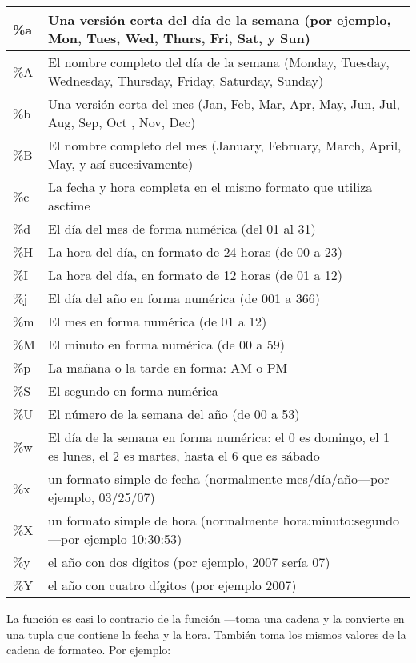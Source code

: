\begin{center}
\begin{tabular}{|l|p{12cm}|}
\hline
\%a & Una versión corta del día de la semana (por ejemplo, Mon, Tues, Wed, Thurs, Fri, Sat, y Sun) \\
\hline
\%A & El nombre completo del día de la semana (Monday, Tuesday, Wednesday, Thursday, Friday, Saturday, Sunday) \\
\hline
\%b & Una versión corta del mes (Jan, Feb, Mar, Apr, May, Jun, Jul, Aug, Sep, Oct , Nov, Dec) \\
\hline
\%B & El nombre completo del mes (January, February, March, April, May, y así sucesivamente) \\
\hline
\%c & La fecha y hora completa en el mismo formato que utiliza asctime \\
\hline
\%d & El día del mes de forma numérica (del 01 al 31) \\
\hline
\%H & La hora del día, en formato de 24 horas (de 00 a 23) \\
\hline
\%I & La hora del día, en formato de 12 horas (de 01 a 12) \\
\hline
\%j & El día del año en forma numérica (de 001 a 366) \\
\hline
\%m & El mes en forma numérica (de 01 a 12) \\
\hline
\%M & El minuto en forma numérica (de 00 a 59) \\
\hline
\%p & La mañana o la tarde en forma: AM o PM \\
\hline
\%S & El segundo en forma numérica \\
\hline
\%U & El número de la semana del año (de 00 a 53) \\
\hline
\%w & El día de la semana en forma numérica: el 0 es domingo, el 1 es lunes, el 2 es martes, hasta el 6 que es sábado \\
\hline
\%x & un formato simple de fecha (normalmente mes/día/año---por ejemplo, 03/25/07) \\
\hline
\%X & un formato simple de hora (normalmente hora:minuto:segundo---por ejemplo 10:30:53) \\
\hline
\%y & el año con dos dígitos (por ejemplo, 2007 sería 07) \\
\hline
\%Y & el año con cuatro dígitos (por ejemplo 2007) \\
\hline
\end{tabular}
\end{center}

La función  es casi lo contrario de la función ---toma una cadena y la convierte en una tupla que contiene la fecha y la hora.   También toma los mismos valores de la cadena de formateo.   Por ejemplo:

